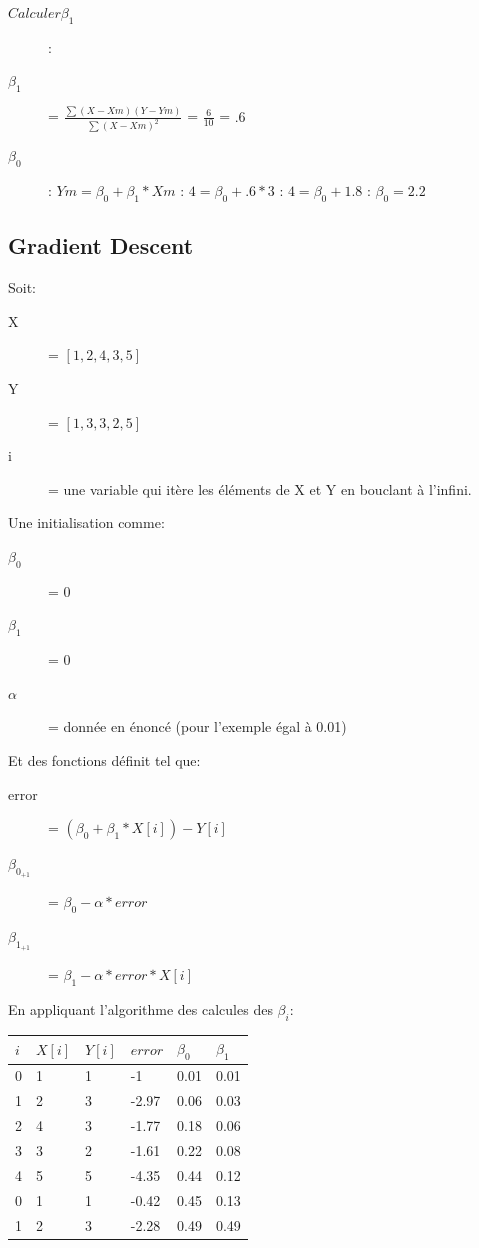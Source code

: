 \begin{description}
\item[$Calculer \beta_1$]:
\item[$ \beta_1 $] = $ \frac{ \sum (X-Xm)(Y-Ym)}{ \sum (X-Xm)^2}$ = $\frac{6}{10}$ = $.6$
\item[$ \beta_0 $]: $Ym = \beta_0 + \beta_1 * Xm$ : $4 = \beta_0 + .6 * 3$ : $4= \beta_0 + 1.8$ : $\beta_0 = 2.2$
\end{description}
\pagebreak
\subsection{Gradient Descent}
Soit:
\begin{description}
\item[X] = $[1,2,4,3,5]$
\item[Y] = $[1,3,3,2,5]$
\item[i] = une variable qui itère les éléments de X et Y en bouclant à l'infini.
\end{description}
Une initialisation comme:
\begin{description}
\item[$\beta_0$] = 0
\item[$\beta_1$] = 0
\item[$\alpha$] = donnée en énoncé (pour l'exemple égal à 0.01)
\end{description}
Et des fonctions définit tel que:
\begin{description}
\item[error] = $(\beta_0 + \beta_1 * X[i]) - Y[i]$
\item[$\beta_{0_{+1}}$] = $\beta_0 - \alpha * error$
\item[$\beta_{1_{+1}}$] = $\beta_1 - \alpha * error * X[i]$
\end{description}

En appliquant l'algorithme des calcules des $\beta_i$:\\
\begin{tabular}{l|l|l|l|l|l}
  \hline
  $ i $ & $ X[i] $ &  $Y[i] $ &  $error $ & $ \beta_0 $ & $ \beta_1 $\\
  \hline
  0 & 1 & 1 & -1 & 0.01 & 0.01 \\
  1 & 2 & 3 & -2.97 & 0.06 & 0.03\\
  2 & 4 & 3 & -1.77 & 0.18 & 0.06\\
  3 & 3 & 2 & -1.61 & 0.22 & 0.08\\
  4 & 5 & 5 & -4.35 & 0.44 & 0.12\\
  0 & 1 & 1 & -0.42 & 0.45 & 0.13\\
  1 & 2 & 3 & -2.28 & 0.49 & 0.49\\
  \hline
\end{tabular}
\pagebreak
